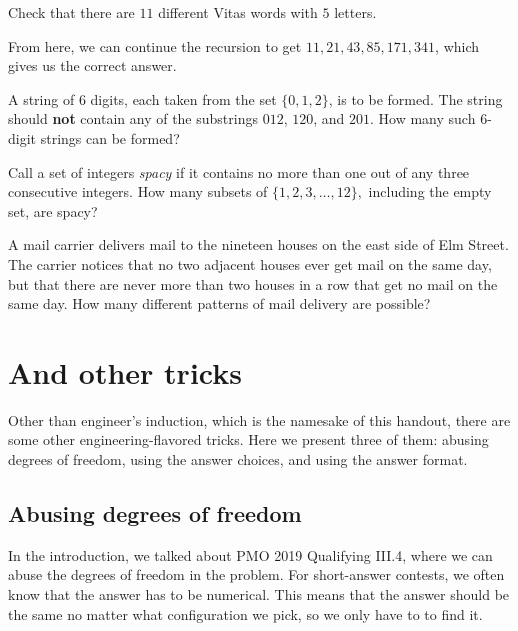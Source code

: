 \documentclass[11pt,paper=letter]{scrartcl}
\begin{document}
\begin{exrboxed}
  Check that there are $11$ different Vitas words with $5$ letters.
\end{exrboxed}

From here, we can continue the recursion to get $11, 21, 43, 85, 171, 341$, which gives us the correct answer.

\begin{mdframed}[style=exmdbox]

\begin{problem}
  A string of $6$ digits, each taken from the set $\{0, 1, 2\}$, is to be formed. The string should \textbf{not} contain any of the substrings $012$, $120$, and $201$. How many such $6$-digit strings can be formed?
\end{problem}

\begin{problem}[AMC 12A 2007/25]
  Call a set of integers \textit{spacy} if it contains no more than one out of any three consecutive integers. How many subsets of $\{1,2,3,\ldots,12\},$ including the empty set, are spacy?
\end{problem}

\begin{problem}[AIME I 2001/14]
  A mail carrier delivers mail to the nineteen houses on the east side of Elm Street. The carrier notices that no two adjacent houses ever get mail on the same day, but that there are never more than two houses in a row that get no mail on the same day. How many different patterns of mail delivery are possible?
\end{problem}

\end{mdframed}

\section{And other tricks}

Other than engineer's induction, which is the namesake of this handout, there are some other engineering-flavored tricks. Here we present three of them: abusing degrees of freedom, using the answer choices, and using the answer format.

\subsection{Abusing degrees of freedom}

In the introduction, we talked about PMO 2019 Qualifying III.4, where we can abuse the degrees of freedom in the problem. For short-answer contests, we often know that the answer has to be numerical. This means that the answer should be the same no matter what configuration we pick, so we only have to  to find it.
\end{document}
